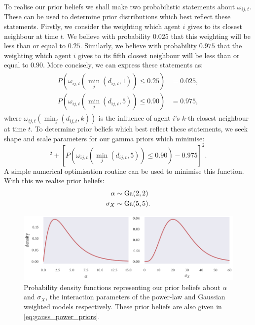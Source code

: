 To realise our prior beliefs we shall make two probabilistic statements about
$\omega_{ij,t}$. These can be used to determine prior distributions which best reflect
these statements. Firstly, we consider the weighting which agent $i$ gives to its closest
neighbour at time $t$. We believe with probability $0.025$ that this weighting will be less
than or equal to $0.25$. Similarly, we believe with probability $0.975$ that the
weighting which agent $i$ gives to its fifth closest neighbour will be less than or equal
to $0.90$.  More concisely, we can express these statements as:
\begin{align}
  \label{eq:omega_statements}
  \begin{split}
    P(\omega_{ij, t}({\min_j(d_{ij,t}, 1)}) \leq 0.25) & = 0.025, \\
    P(\omega_{ij, t}({\min_j(d_{ij,t}, 5)}) \leq 0.90) & = 0.975,
  \end{split}
\end{align}
where $\omega_{ij, t}({\min_j(d_{ij,t}, k)})$ is the influence of agent $i$'s $k$-th
closest neighbour at time $t$. To determine prior beliefs which best reflect these
statements, we seek shape and scale parameters for our gamma priors which minimise:
\begin{equation*}
  [P(\omega_{ij, t}({\min_j(d_{ij,t}, 1)}) \leq 0.25) - 0.025]^2
  + [P(\omega_{ij, t}({\min_j(d_{ij,t}, 5)}) \leq 0.90) - 0.975]^2.
\end{equation*}
A simple numerical optimisation routine can be used to minimise this function. With this
we realise prior beliefs:
\begin{align}
  \label{eq:gauss_power_priors}
  \begin{split}
    \alpha   & \sim \textrm{Ga}(2, 2) \\
    \sigma_X & \sim \textrm{Ga}(5, 5).
  \end{split}
\end{align}
\begin{figure}[tbp]
  \includegraphics{gauss_power_priors.pdf}
  \caption{Probability density functions representing our prior beliefs about $\alpha$
    and $\sigma_X$, the interaction parameters of the power-law and Gaussian weighted
    models respectively. These prior beliefs are also given in
    \cref{eq:gauss_power_priors}.}
\end{figure}

